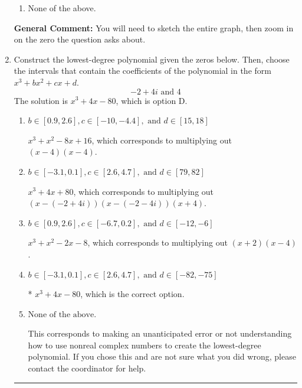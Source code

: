 \documentclass{extbook}[14pt]
\newcommand{\litem}[1]{\item #1

\rule{\textwidth}{0.4pt}}
\begin{document}
\begin{enumerate}
{\begin{enumerate}[label=\Alph*.]
\item None of the above.\end{enumerate}
\textbf{General Comment:} You will need to sketch the entire graph, then zoom in on the zero the question asks about.
}
\litem{
Construct the lowest-degree polynomial given the zeros below. Then, choose the intervals that contain the coefficients of the polynomial in the form $x^3+bx^2+cx+d$.
\[ -2 + 4 i \text{ and } 4 \]The solution is \( x^{3} +4 x -80 \), which is option D.\begin{enumerate}[label=\Alph*.]
\item \( b \in [0.9, 2.6], c \in [-10, -4.4], \text{ and } d \in [15, 18] \)

$x^{3} + x^{2} -8 x + 16$, which corresponds to multiplying out $(x -4)(x -4)$.
\item \( b \in [-3.1, 0.1], c \in [2.6, 4.7], \text{ and } d \in [79, 82] \)

$x^{3} +4 x + 80$, which corresponds to multiplying out $(x-(-2 + 4 i))(x-(-2 - 4 i))(x + 4)$.
\item \( b \in [0.9, 2.6], c \in [-6.7, 0.2], \text{ and } d \in [-12, -6] \)

$x^{3} + x^{2} -2 x -8$, which corresponds to multiplying out $(x + 2)(x -4)$.
\item \( b \in [-3.1, 0.1], c \in [2.6, 4.7], \text{ and } d \in [-82, -75] \)

* $x^{3} +4 x -80$, which is the correct option.
\item \( \text{None of the above.} \)

This corresponds to making an unanticipated error or not understanding how to use nonreal complex numbers to create the lowest-degree polynomial. If you chose this and are not sure what you did wrong, please contact the coordinator for help.
\end{enumerate}

}
\end{enumerate}
\end{document}
